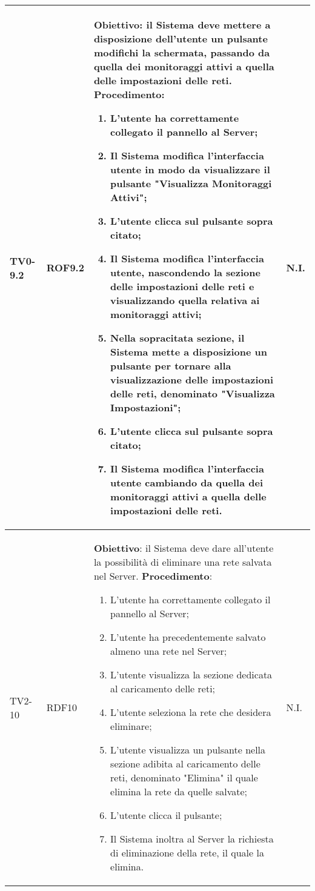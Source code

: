 \begin{longtable}{|C{.15\textwidth}|C{.13\textwidth}|m{.52\textwidth}|C{.08\textwidth}|}
TV0-9.2 & ROF9.2 &
	\textbf{Obiettivo}: il Sistema deve mettere a disposizione dell'utente un pulsante modifichi la schermata, passando da quella dei monitoraggi attivi a quella delle impostazioni delle reti. \newline
	\textbf{Procedimento}:
	\begin{enumerate}
		\item L'utente ha correttamente collegato il pannello al Server;
		\item Il Sistema modifica l'interfaccia utente in modo da visualizzare il pulsante "Visualizza Monitoraggi Attivi";
		\item L'utente clicca sul pulsante sopra citato;
		\item Il Sistema modifica l'interfaccia utente, nascondendo la sezione delle impostazioni delle reti e visualizzando quella relativa ai monitoraggi attivi;
		\item Nella sopracitata sezione, il Sistema mette a disposizione un pulsante per tornare alla visualizzazione delle impostazioni delle reti, denominato "Visualizza Impostazioni";
		\item L'utente clicca sul pulsante sopra citato;
		\item Il Sistema modifica l'interfaccia utente cambiando da quella dei monitoraggi attivi a quella delle impostazioni delle reti.
	\end{enumerate}
	& N.I. \\
\hline

TV2-10 & RDF10 &
	\textbf{Obiettivo}: il Sistema deve dare all'utente la possibilità di eliminare una rete salvata nel Server. \newline
	\textbf{Procedimento}:
	\begin{enumerate}
		\item L'utente ha correttamente collegato il pannello al Server;
		\item L'utente ha precedentemente salvato almeno una rete nel Server;
		\item L'utente visualizza la sezione dedicata al caricamento delle reti;
		\item L'utente seleziona la rete che desidera eliminare;
		\item L'utente visualizza un pulsante nella sezione adibita al caricamento delle reti, denominato "Elimina" il quale elimina la rete da quelle salvate;
		\item L'utente clicca il pulsante;
		\item Il Sistema inoltra al Server la richiesta di eliminazione della rete, il quale la elimina.
	\end{enumerate}
	& N.I. \\
\hline



\end{longtable}
